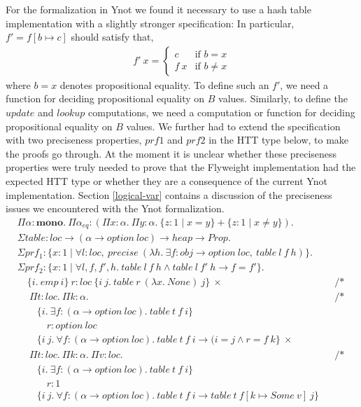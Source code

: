 \documentclass[a4paper,english]{article}
\newcommand{\HEAP}[0]{heap}
\newcommand{\PROP}[0]{Prop}
\newcommand{\MONO}[0]{\mathbf{mono}}
\newcommand{\LOC}[0]{loc}
\newcommand{\OPTION}[0]{option}
\newcommand{\pname}[1]{\texttt{/* #1 */}}
\begin{document}
For the formalization in Ynot we found it necessary to use a hash table
implementation with a slightly stronger specification: In particular,
$f' = f[b \mapsto c]$ should satisfy that,
\begin{align*}
f'\ x = 
\begin{cases}
c & \text{if $b = x$}\\
f\ x & \text{if $b \neq x$}
\end{cases}
\end{align*}
where $b = x$ denotes propositional equality. To define such an $f'$, we need a
function for deciding propositional equality on $B$ values. Similarly, to
define the $update$ and $lookup$ computations, we need a computation or
function for deciding propositional equality on $B$ values. We further had to
extend the specification with two preciseness properties, $prf1$ and $prf2$ in
the HTT type below, to make the proofs go through. At the moment it is unclear
whether these preciseness properties were truly needed to prove that the
Flyweight implementation had the expected HTT type or whether they are a
consequence of the current Ynot implementation. Section \ref{logical-var}
contains a discussion of the preciseness issues we encountered with the Ynot
formalization.  
\begin{align*}
&\Pi \alpha : \MONO.\ \Pi \alpha_{eq} : (\Pi x : \alpha.\ \Pi y : \alpha.\ \{ z : 1 \mid x = y \} + \{ z : 1 \mid x \neq y \}).\\
&\Sigma table : \LOC \rightarrow (\alpha \rightarrow \OPTION\ \LOC) \rightarrow \HEAP \rightarrow \PROP.\\
&\Sigma prf_1 : \{ x : 1 \mid \forall l : \LOC,\ precise\ (\lambda h.\ \exists f : obj \rightarrow \OPTION\ \LOC,\ table\ l\ f\ h) \}.\\
&\Sigma prf_2 : \{ x : 1 \mid \forall l, f, f', h.\ table\ l\ f\ h \land table\ l\ f'\ h \rightarrow f = f' \}.\\
&\quad \{ i.\ emp\ i \}\ r : \LOC\ \{ i\ j.\ table\ r\ (\lambda x.\ None)\ j \}\ \times && \pname{newtable}\\
&\quad\ \Pi t : \LOC.\ \Pi k : \alpha. && \pname{lookup}\\
&\quad\quad \{ i.\ \exists f : (\alpha \rightarrow \OPTION\ \LOC).\ table\ t\ f\ i \}\\
&\quad\quad\quad r : \OPTION\ \LOC\\
&\quad\quad \{ i\ j.\ \forall f : (\alpha \rightarrow \OPTION\ \LOC).\ table\ t\ f\ i \rightarrow (i = j \land r = f\ k \}\ \times\\
&\quad\ \Pi t : \LOC.\ \Pi k : \alpha.\ \Pi v : \LOC. && \pname{update}\\
&\quad\quad \{ i.\ \exists f : (\alpha \rightarrow \OPTION\ \LOC).\ table\ t\ f\ i \}\\
&\quad\quad\quad r : 1\\
&\quad\quad \{ i\ j.\ \forall f : (\alpha \rightarrow \OPTION\ \LOC).\ table\ t\ f\ i \rightarrow table\ t\ f[k \mapsto Some\ v]\ j \}
\end{align*}
\end{document}
